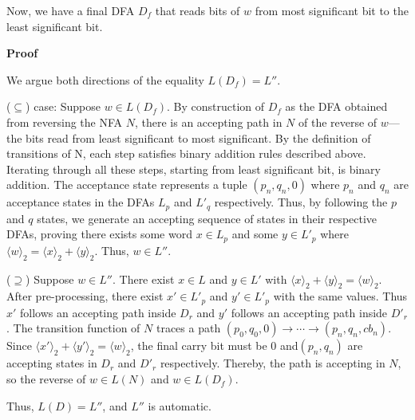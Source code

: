 \documentclass[12pt]{article}
\begin{document}
\begin{solution}
Now, we have a final DFA $D_f$ that reads bits of $w$ from most significant bit to the least significant bit.

\medskip
\textbf{Proof}

We argue both directions of the equality $L(D_f) = L''$.

\medskip
($\subseteq$) case: Suppose $w \in L(D_f)$. By construction of $D_f$ as the
DFA obtained from reversing the NFA $N$, there is an accepting path in $N$ of the reverse of $w$—the bits read from least significant to most significant. By the definition of transitions of N, each step satisfies binary addition rules described above. Iterating through all these steps, starting from least significant bit, is binary addition. The acceptance state represents a tuple $(p_n, q_n, 0)$ where $p_n$ and $q_n$ are acceptance states in the DFAs $L_p$ and $L'_q$ respectively. Thus, by following the $p$ and $q$ states, we generate an accepting sequence of states in their respective DFAs, proving there exists some word $x \in L_p$ and some $y \in L'_p$ where $\langle w \rangle_2 = \langle x \rangle_2 + \langle y \rangle_2$. Thus, $w \in L''$.


($\supseteq$) Suppose $w \in L''$. There exist $x \in L$ and $y \in L'$ with
$\langle x \rangle_2 + \langle y \rangle_2 = \langle w \rangle_2$.
After pre-processing, there exist $x' \in L'_p$ and
$y' \in L'_p$ with the same values. Thus $x'$ follows an accepting path inside $D_r$ and $y'$ follows an accepting path inside $D'_r$. The transition function of $N$ traces a
path $(p_0, q_0, 0) \to \cdots \to (p_n, q_n, cb_n)$. Since $\langle x' \rangle_2 + \langle y' \rangle_2 = \langle w \rangle_2$, the final carry bit must be 0 and$(p_n, q_n)$ are accepting states in $D_r$ and $D'_r$ respectively. Thereby, the path is accepting in $N$, so the reverse of $w \in L(N)$ and $w \in L(D_f)$.

Thus, $L(D) = L''$, and $L''$ is automatic.
    
\end{solution}

\newpage 
\end{document}
